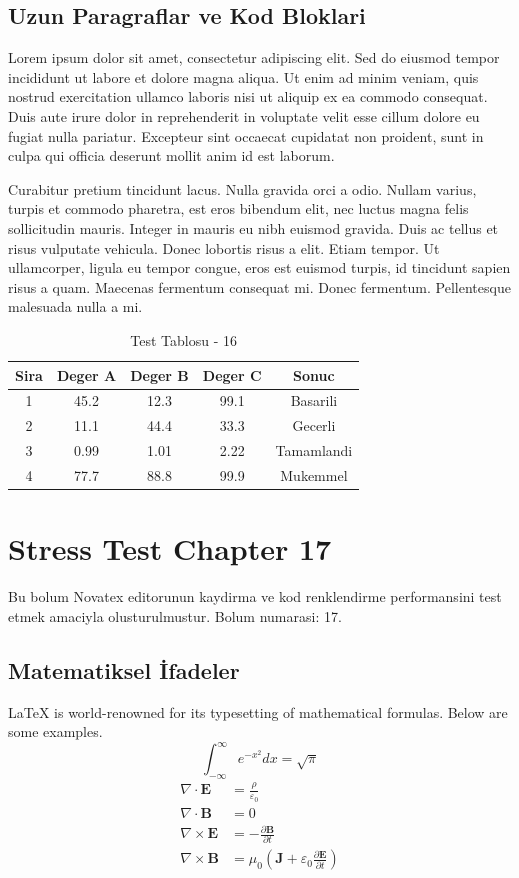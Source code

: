 \documentclass[12pt,a4paper]{article}
\begin{document}
\subsection{Uzun Paragraflar ve Kod Bloklari}
Lorem ipsum dolor sit amet, consectetur adipiscing elit. Sed do eiusmod tempor incididunt ut labore et dolore magna aliqua. Ut enim ad minim veniam, quis nostrud exercitation ullamco laboris nisi ut aliquip ex ea commodo consequat. Duis aute irure dolor in reprehenderit in voluptate velit esse cillum dolore eu fugiat nulla pariatur. Excepteur sint occaecat cupidatat non proident, sunt in culpa qui officia deserunt mollit anim id est laborum.

Curabitur pretium tincidunt lacus. Nulla gravida orci a odio. Nullam varius, turpis et commodo pharetra, est eros bibendum elit, nec luctus magna felis sollicitudin mauris. Integer in mauris eu nibh euismod gravida. Duis ac tellus et risus vulputate vehicula. Donec lobortis risus a elit. Etiam tempor. Ut ullamcorper, ligula eu tempor congue, eros est euismod turpis, id tincidunt sapien risus a quam. Maecenas fermentum consequat mi. Donec fermentum. Pellentesque malesuada nulla a mi.

\begin{table}[h!]
\centering
\begin{tabular}{|c|c|c|c|c|}
\hline
\textbf{Sira} & \textbf{Deger A} & \textbf{Deger B} & \textbf{Deger C} & \textbf{Sonuc} \\
\hline
1 & 45.2 & 12.3 & 99.1 & Basarili \\
2 & 11.1 & 44.4 & 33.3 & Gecerli \\
3 & 0.99 & 1.01 & 2.22 & Tamamlandi \\
4 & 77.7 & 88.8 & 99.9 & Mukemmel \\
\hline
\end{tabular}
\caption{Test Tablosu - 16}
\end{table}

\newpage
\section{Stress Test Chapter 17}
Bu bolum Novatex editorunun kaydirma ve kod renklendirme performansini test etmek amaciyla olusturulmustur. Bolum numarasi: 17.

\subsection{Matematiksel İfadeler}
\LaTeX{} is world-renowned for its typesetting of mathematical formulas. Below are some examples.
\begin{equation}
\int_{-\infty}^{\infty} e^{-x^2} dx = \sqrt{\pi}
\end{equation}
\begin{align}
\nabla \cdot \mathbf{E} &= \frac{\rho}{\varepsilon_0} \\
\nabla \cdot \mathbf{B} &= 0 \\
\nabla \times \mathbf{E} &= -\frac{\partial \mathbf{B}}{\partial t} \\
\nabla \times \mathbf{B} &= \mu_0\left(\mathbf{J} + \varepsilon_0 \frac{\partial \mathbf{E}}{\partial t}\right)
\end{align}
\end{document}
